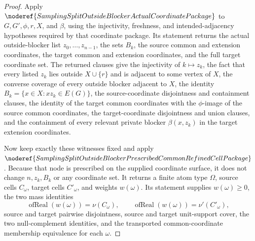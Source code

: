\begin{proof}
Apply
\(\noderef{SamplingSplitOutsideBlockerActualCoordinatePackage}\) to
\(G,G',\phi,r,X\), and \(\beta\), using the injectivity, freshness, and
intended-adjacency hypotheses required by that coordinate package.  Its
statement returns the actual
outside-blocker list \(z_0,\ldots,z_{n-1}\), the sets \(B_k\), the source
common and extension coordinates, the target common and extension
coordinates, and the full target coordinate set.  The returned clauses give
the injectivity of \(k\mapsto z_k\), the fact that every listed \(z_k\) lies
outside \(X\cup\{r\}\) and is adjacent to some vertex of \(X\), the converse
coverage of every outside blocker adjacent to \(X\), the identity
\(B_k=\{x\in X:xz_k\in E(G)\}\), the source-coordinate disjointness and
containment clauses, the identity of the target common coordinates with the
\(\phi\)-image of the source common coordinates, the target-coordinate
disjointness and union clauses, and the containment of every relevant
private blocker \(\beta(x,z_k)\) in the target extension coordinates.

Now keep exactly these witnesses fixed and apply
\(\noderef{SamplingSplitOutsideBlockerPrescribedCommonRefinedCellPackage}\).
Because that node is prescribed on the supplied coordinate surface, it does
not change \(n,z_k,B_k\) or any coordinate set.  It returns a finite atom type
\(\Omega\), source cells \(C_\omega\), target cells \(C'_\omega\), and weights
\(w(\omega)\).  Its statement supplies \(w(\omega)\ge0\), the two mass
identities
\[
  \operatorname{ofReal}(w(\omega))=\nu(C_\omega),
  \qquad
  \operatorname{ofReal}(w(\omega))=\nu'(C'_\omega),
\]
source and target pairwise disjointness, source and target unit-support
cover, the two null-complement identities, and the transported
common-coordinate membership equivalence for each \(\omega\).


\end{proof}
